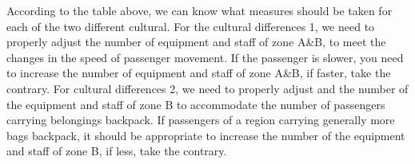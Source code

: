 According to the table above, we can know what measures should be taken for each of the two different cultural. For the cultural differences 1, we need to properly adjust the number of equipment and staff of zone A\&B, to meet the changes in the speed of passenger movement. If the passenger is slower, you need to increase the number of equipment and staff of zone A\&B, if faster, take the contrary. For cultural differences 2, we need to properly adjust and the number of the equipment and staff of zone B to accommodate the number of passengers carrying belongings backpack. If passengers of a region carrying generally more bags backpack, it should be appropriate to increase the number of the equipment and staff of zone B, if less, take the contrary.
